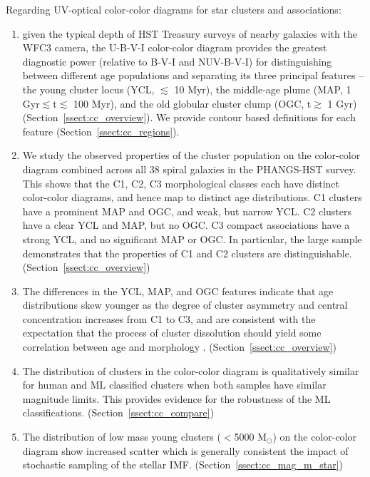 \documentclass[linenumbers]{aastex63}
\begin{document}
Regarding UV-optical color-color diagrams for star clusters and associations:
\begin{enumerate}  
\item given the typical depth of HST Treasury surveys of nearby galaxies with the WFC3 camera, the U-B-V-I color-color diagram provides the greatest diagnostic power (relative to B-V-I and NUV-B-V-I) for distinguishing between different age populations and separating its three principal features --  the young cluster locus (YCL, $\lesssim$ 10 Myr), the middle-age plume (MAP, 1 Gyr$\lesssim$t$\lesssim$ 100 Myr), and the old globular cluster clump (OGC, t$\gtrsim$ 1 Gyr) (Section~\ref{ssect:cc_overview}).  We provide contour based definitions for each feature (Section~\ref{ssect:cc_regions}).
\item We study the observed properties of the cluster population on the color-color diagram combined across all 38 spiral galaxies in the PHANGS-HST survey.  This shows that the C1, C2, C3 morphological classes each have distinct color-color diagrams, and hence map to distinct age distributions.  C1 clusters have a prominent MAP and OGC, and weak, but narrow YCL.  C2 clusters have a clear YCL and MAP, but no OGC.  C3 compact associations have a strong YCL, and no significant MAP or OGC. In particular, the large sample demonstrates that the properties of C1 and C2 clusters are distinguishable. (Section~\ref{ssect:cc_overview})  
\item The differences in the YCL, MAP, and OGC features indicate that age distributions skew younger as the degree of cluster asymmetry and central concentration increases from C1 to C3, and are consistent with the expectation that the process of cluster dissolution should yield some correlation between age and morphology \citep[e.g.,][and references therein]{adamo_legacy_2017, whitmore_star_2021, cook23}. (Section~\ref{ssect:cc_overview})
\item  The distribution of clusters in the color-color diagram is qualitatively similar for human and ML classified clusters when both samples have similar magnitude limits.  This provides evidence for the robustness of the ML classifications.  (Section~\ref{ssect:cc_compare})
\item The distribution of low mass young clusters ($<$5000 M$_\odot$) on the color-color diagram show increased scatter which is generally consistent the impact of stochastic sampling of the stellar IMF.  (Section~\ref{ssect:cc_mag_m_star})
\end{enumerate}
\end{document}
